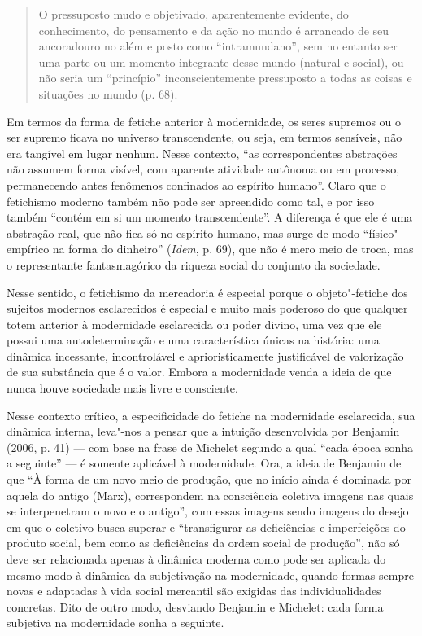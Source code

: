 \begin{quote}
O pressuposto mudo e objetivado, aparentemente evidente, do
conhecimento, do pensamento e da ação no mundo é arrancado de seu
ancoradouro no além e posto como ``intramundano'', sem no entanto ser uma
parte ou um momento integrante desse mundo (natural e social), ou não
seria um ``princípio'' inconscientemente pressuposto a todas as coisas e
situações no mundo (p. 68).
\end{quote}

Em termos da forma de fetiche anterior à modernidade, os seres supremos
ou o ser supremo ficava no universo transcendente, ou seja, em termos
sensíveis, não era tangível em lugar nenhum. Nesse contexto, ``as
correspondentes abstrações não assumem forma visível, com aparente
atividade autônoma ou em processo, permanecendo antes fenômenos
confinados ao espírito humano''. Claro que o fetichismo moderno também
não pode ser apreendido como tal, e por isso também ``contém em si um
momento transcendente''. A diferença é que ele é uma abstração real, que
não fica só no espírito humano, mas surge de modo ``físico"-empírico na
forma do dinheiro'' (\emph{Idem}, p. 69), que não é mero meio de troca,
mas o representante fantasmagórico da riqueza social do conjunto da
sociedade.

Nesse sentido, o fetichismo da mercadoria é especial porque o
objeto"-fetiche dos sujeitos modernos esclarecidos é especial e muito
mais poderoso do que qualquer totem anterior à modernidade esclarecida
ou poder divino, uma vez que ele possui uma autodeterminação e uma
característica únicas na história: uma dinâmica incessante,
incontrolável e aprioristicamente justificável de valorização de sua
substância que é o valor. Embora a modernidade venda a ideia de que
nunca houve sociedade mais livre e consciente.

Nesse contexto crítico, a especificidade do fetiche na modernidade
esclarecida, sua dinâmica interna, leva"-nos a pensar que a intuição
desenvolvida por Benjamin (2006, p. 41) --- com base na frase de Michelet
segundo a qual ``cada época sonha a seguinte'' --- é somente aplicável à modernidade.
Ora, a ideia de Benjamin de que ``À forma de um novo meio de produção,
que no início ainda é dominada por aquela do antigo (Marx), correspondem
na consciência coletiva imagens nas quais se interpenetram o novo e o
antigo'', com essas imagens sendo imagens do desejo em que o coletivo
busca superar e ``transfigurar as deficiências e imperfeições do produto
social, bem como as deficiências da ordem social de produção'', não só
deve ser relacionada apenas à dinâmica moderna como pode ser aplicada do
mesmo modo à dinâmica da subjetivação na modernidade, quando formas
sempre novas e adaptadas à vida social mercantil são exigidas das
individualidades concretas. Dito de outro modo, desviando Benjamin e
Michelet: cada forma subjetiva na modernidade sonha a seguinte.

